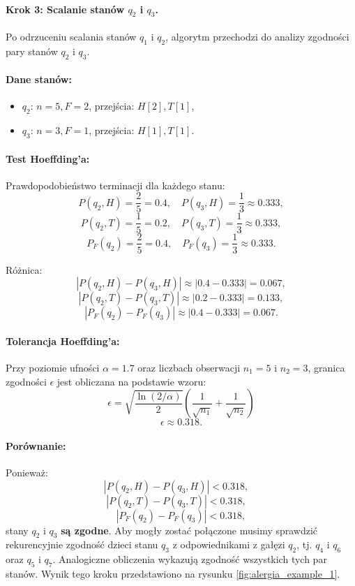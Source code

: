 \paragraph*{Krok 3: Scalanie stanów \( q_2 \) i \( q_3 \).}  
Po odrzuceniu scalania stanów \( q_1 \) i \( q_2 \), algorytm przechodzi do analizy zgodności pary stanów \( q_2 \) i \( q_3 \).

\paragraph*{Dane stanów:}  
\begin{itemize}  
    \item \( q_2 \): \( n = 5, F = 2 \), przejścia: \( H[2], T[1] \), 
    \item \( q_3 \): \( n = 3, F = 1 \), przejścia: \( H[1], T[1] \).  
\end{itemize}  

\paragraph*{Test Hoeffding’a:}  
Prawdopodobieństwo terminacji dla każdego stanu:  
\[
P(q_2, H) = \frac{2}{5} = \num{0.4}, \quad P(q_3, H) = \frac{1}{3} \approx \num{0.333},
\]
\[
P(q_2, T) = \frac{1}{5} = \num{0.2}, \quad P(q_3, T) = \frac{1}{3} \approx \num{0.333},
\]
\[
P_F(q_2) = \frac{2}{5} = \num{0.4}, \quad P_F(q_3) = \frac{1}{3} \approx \num{0.333}.
\]

Różnica:  
\[
|P(q_2, H) - P(q_3, H)| \approx |\num{0.4} - \num{0.333}| = \num{0.067},
\]
\[
|P(q_2, T) - P(q_3, T)| \approx |\num{0.2} - \num{0.333}| = \num{0.133},
\]
\[
|P_F(q_2) - P_F(q_3)| \approx |\num{0.4} - \num{0.333}| = \num{0.067}.
\]

\paragraph*{Tolerancja Hoeffding’a:}  
Przy poziomie ufności \( \alpha = \num{1.7} \) oraz liczbach obserwacji \( n_1 = 5 \) i \( n_2 = 3 \), granica zgodności \( \epsilon \) jest obliczana na podstawie wzoru:  
\[
\epsilon = \sqrt{\frac{\ln(2 / \alpha)}{2}} \left( \frac{1}{\sqrt{n_1}} + \frac{1}{\sqrt{n_2}} \right)
\]
\[
\epsilon \approx \num{0.318}.
\]

\paragraph*{Porównanie:}  
Ponieważ:  
\[
|P(q_2, H) - P(q_3, H)| < \num{0.318}, \quad
\]
\[
|P(q_2, T) - P(q_3, T)| < \num{0.318}, \quad
\]
\[
|P_F(q_2) - P_F(q_3)| < \num{0.318},
\]  
stany \( q_2 \) i \( q_3 \) \textbf{są zgodne}. Aby mogły zostać połączone musimy sprawdzić rekurencyjnie zgodność dzieci stanu $q_3$ z odpowiednikami z gałęzi $q_2$, tj. $q_4$ i $q_6$ oraz $q_5$ i $q_7$. Analogiczne obliczenia wykazują zgodność wszystkich tych par stanów. Wynik tego kroku przedstawiono na rysunku \ref{fig:alergia_example_1}.  

